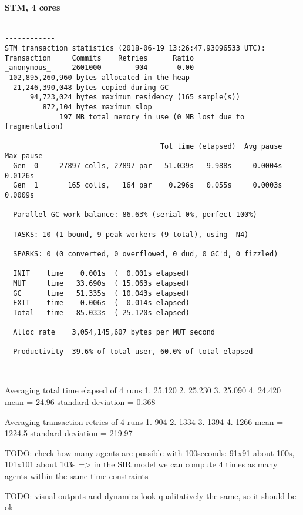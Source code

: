 \paragraph{STM, 4 cores}
\begin{verbatim}
----------------------------------------------------------------------------------
STM transaction statistics (2018-06-19 13:26:47.93096533 UTC):
Transaction     Commits    Retries      Ratio
_anonymous_     2601000        904       0.00
 102,895,260,960 bytes allocated in the heap
  21,246,390,048 bytes copied during GC
      94,723,024 bytes maximum residency (165 sample(s))
         872,104 bytes maximum slop
             197 MB total memory in use (0 MB lost due to fragmentation)

                                     Tot time (elapsed)  Avg pause  Max pause
  Gen  0     27897 colls, 27897 par   51.039s   9.988s     0.0004s    0.0126s
  Gen  1       165 colls,   164 par    0.296s   0.055s     0.0003s    0.0009s

  Parallel GC work balance: 86.63% (serial 0%, perfect 100%)

  TASKS: 10 (1 bound, 9 peak workers (9 total), using -N4)

  SPARKS: 0 (0 converted, 0 overflowed, 0 dud, 0 GC'd, 0 fizzled)

  INIT    time    0.001s  (  0.001s elapsed)
  MUT     time   33.690s  ( 15.063s elapsed)
  GC      time   51.335s  ( 10.043s elapsed)
  EXIT    time    0.006s  (  0.014s elapsed)
  Total   time   85.033s  ( 25.120s elapsed)

  Alloc rate    3,054,145,607 bytes per MUT second

  Productivity  39.6% of total user, 60.0% of total elapsed
----------------------------------------------------------------------------------
\end{verbatim}
  
Averaging total time elapsed of 4 runs 
1. 25.120
2. 25.230
3. 25.090
4. 24.420
mean = 24.96
standard deviation = 0.368

Averaging transaction retries of 4 runs
1. 904
2. 1334
3. 1394
4. 1266
mean = 1224.5
standard deviation = 219.97

TODO: check how many agents are possible with 100seconds: 91x91 about 100s, 101x101 about 103s => in the SIR model we can compute 4 times as many agents within the same time-constraints

TODO: visual outputs and dynamics look qualitatively the same, so it should be ok

